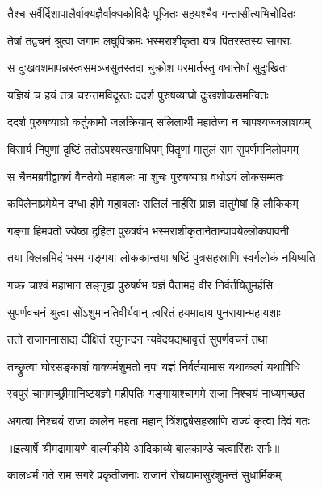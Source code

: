 \twolineshloka
{तैश्च सर्वैर्दिशापालैर्वाक्यज्ञैर्वाक्यकोविदैः}
{पूजितः सहयश्चैव गन्तासीत्यभिचोदितः} %

\twolineshloka
{तेषां तद्वचनं श्रुत्वा जगाम लघुविक्रमः}
{भस्मराशीकृता यत्र पितरस्तस्य सागराः} %

\twolineshloka
{स दुःखवशमापन्नस्त्वसमञ्जसुतस्तदा}
{चुक्रोश परमार्तस्तु वधात्तेषां सुदुःखितः} %

\twolineshloka
{यज्ञियं च हयं तत्र चरन्तमविदूरतः}
{ददर्श पुरुषव्याघ्रो दुःखशोकसमन्वितः} %

\twolineshloka
{ददर्श पुरुषव्याघ्रो कर्तुकामो जलक्रियाम्}
{सलिलार्थी महातेजा न चापश्यज्जलाशयम्} %

\twolineshloka
{विसार्य निपुणां दृष्टिं ततोऽपश्यत्खगाधिपम्}
{पितॄणां मातुलं राम सुपर्णमनिलोपमम्} %

\twolineshloka
{स चैनमब्रवीद्वाक्यं वैनतेयो महाबलः}
{मा शुचः पुरुषव्याघ्र वधोऽयं लोकसम्मतः} %

\twolineshloka
{कपिलेनाप्रमेयेन दग्धा हीमे महाबलाः}
{सलिलं नार्हसि प्राज्ञ दातुमेषां हि लौकिकम्} %

\twolineshloka
{गङ्गा हिमवतो ज्येष्ठा दुहिता पुरुषर्षभ}
{भस्मराशीकृतानेतान्पावयेल्लोकपावनी} %

\twolineshloka
{तया क्लिन्नमिदं भस्म गङ्गया लोककान्तया}
{षष्टिं पुत्रसहस्राणि स्वर्गलोकं नयिष्यति} %

\twolineshloka
{गच्छ चाश्वं महाभाग सङ्गृह्य पुरुषर्षभ}
{यज्ञं पैतामहं वीर निर्वर्तयितुमर्हसि} %

\twolineshloka
{सुपर्णवचनं श्रुत्वा सोंऽशुमानतिवीर्यवान्}
{त्वरितं हयमादाय पुनरायान्महायशाः} %

\twolineshloka
{ततो राजानमासाद्य दीक्षितं रघुनन्दन}
{न्यवेदयद्यथावृत्तं सुपर्णवचनं तथा} %

\twolineshloka
{तच्छ्रुत्वा घोरसङ्काशं वाक्यमंशुमतो नृपः}
{यज्ञं निर्वर्तयामास यथाकल्पं यथाविधि} %

\twolineshloka
{स्वपुरं चागमच्छ्रीमानिष्टयज्ञो महीपतिः}
{गङ्गायाश्चागमे राजा निश्चयं नाध्यगच्छत} %

\twolineshloka
{अगत्वा निश्चयं राजा कालेन महता महान्}
{त्रिंशद्वर्षसहस्राणि राज्यं कृत्वा दिवं गतः} %


{॥इत्यार्षे श्रीमद्रामायणे वाल्मीकीये आदिकाव्ये बालकाण्डे चत्वारिंशः सर्गः॥}


\twolineshloka
{कालधर्मं गते राम सगरे प्रकृतीजनाः}
{राजानं रोचयामासुरंशुमन्तं सुधार्मिकम्} %

